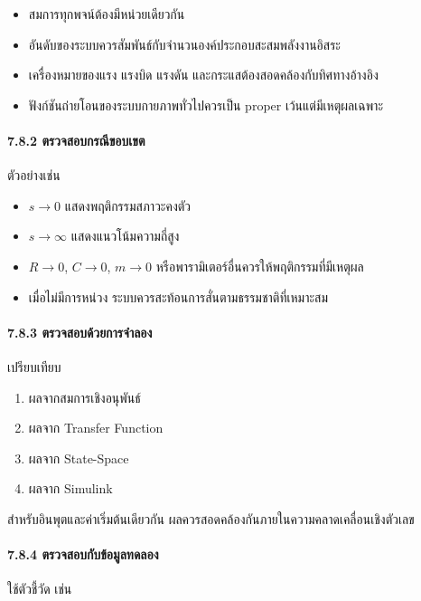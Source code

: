 \begin{itemize}
    \item สมการทุกพจน์ต้องมีหน่วยเดียวกัน
    \item อันดับของระบบควรสัมพันธ์กับจำนวนองค์ประกอบสะสมพลังงานอิสระ
    \item เครื่องหมายของแรง แรงบิด แรงดัน และกระแสต้องสอดคล้องกับทิศทางอ้างอิง
    \item ฟังก์ชันถ่ายโอนของระบบกายภาพทั่วไปควรเป็น proper เว้นแต่มีเหตุผลเฉพาะ
\end{itemize}

\paragraph{7.8.2 ตรวจสอบกรณีขอบเขต}

ตัวอย่างเช่น

\begin{itemize}
    \item $s\rightarrow0$ แสดงพฤติกรรมสภาวะคงตัว
    \item $s\rightarrow\infty$ แสดงแนวโน้มความถี่สูง
    \item $R\rightarrow0$, $C\rightarrow0$, $m\rightarrow0$ หรือพารามิเตอร์อื่นควรให้พฤติกรรมที่มีเหตุผล
    \item เมื่อไม่มีการหน่วง ระบบควรสะท้อนการสั่นตามธรรมชาติที่เหมาะสม
\end{itemize}

\paragraph{7.8.3 ตรวจสอบด้วยการจำลอง}

เปรียบเทียบ

\begin{enumerate}
    \item ผลจากสมการเชิงอนุพันธ์
    \item ผลจาก Transfer Function
    \item ผลจาก State-Space
    \item ผลจาก Simulink
\end{enumerate}

สำหรับอินพุตและค่าเริ่มต้นเดียวกัน ผลควรสอดคล้องกันภายในความคลาดเคลื่อนเชิงตัวเลข

\paragraph{7.8.4 ตรวจสอบกับข้อมูลทดลอง}

ใช้ตัวชี้วัด เช่น

